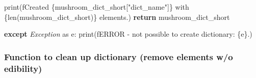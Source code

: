 \documentclass[
]{article}
\newenvironment{Shaded}{\begin{snugshade}}{\end{snugshade}}
\newcommand{\BuiltInTok}[1]{#1}
\newcommand{\ControlFlowTok}[1]{\textcolor[rgb]{0.13,0.29,0.53}{\textbf{#1}}}
\newcommand{\ImportTok}[1]{#1}
\newcommand{\NormalTok}[1]{#1}
\newcommand{\PreprocessorTok}[1]{\textcolor[rgb]{0.56,0.35,0.01}{\textit{#1}}}
\newcommand{\SpecialCharTok}[1]{\textcolor[rgb]{0.00,0.00,0.00}{#1}}
\newcommand{\SpecialStringTok}[1]{\textcolor[rgb]{0.31,0.60,0.02}{#1}}
\newcommand{\StringTok}[1]{\textcolor[rgb]{0.31,0.60,0.02}{#1}}
\begin{document}
\begin{Shaded}
\begin{Highlighting}[]
        \BuiltInTok{print}\NormalTok{(}\SpecialStringTok{f\textquotesingle{}Created }\SpecialCharTok{\{}\NormalTok{mushroom\_dict\_short[}\StringTok{"dict\_name"}\NormalTok{]}\SpecialCharTok{\}}\SpecialStringTok{ with }\SpecialCharTok{\{}\BuiltInTok{len}\NormalTok{(mushroom\_dict\_short)}\SpecialCharTok{\}}\SpecialStringTok{ elements.\textquotesingle{}}\NormalTok{)}
        \ControlFlowTok{return}\NormalTok{ mushroom\_dict\_short}

    \ControlFlowTok{except} \PreprocessorTok{Exception} \ImportTok{as}\NormalTok{ e:}
        \BuiltInTok{print}\NormalTok{(}\SpecialStringTok{f\textquotesingle{}ERROR {-} not possible to create dictionary: }\SpecialCharTok{\{}\NormalTok{e}\SpecialCharTok{\}}\SpecialStringTok{.\textquotesingle{}}\NormalTok{)}
\end{Highlighting}
\end{Shaded}

\hypertarget{function-to-clean-up-dictionary-remove-elements-wo-edibility}{%
\subsubsection{Function to clean up dictionary (remove elements w/o
edibility)}\label{function-to-clean-up-dictionary-remove-elements-wo-edibility}}
\end{document}
